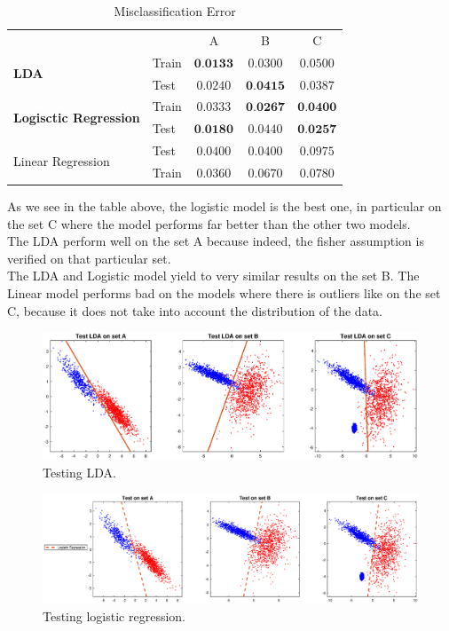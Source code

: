 \documentclass[a4paper,10pt]{article}
\theoremstyle{exostyle}
\begin{document}
\begin{table}[!h]
\centering
\caption{Misclassification Error}
\begin{tabular}{llccc}
\multicolumn{2}{l}{}   & A & B & C \\
\multirow{2}{*}{\textbf{LDA}}                 & Train & $\textbf{0.0133}$   & $0.0300 $  &  $0.0500$ \\
                                      			& Test  & $0.0240$  & $\textbf{0.0415}$  & $0.0387$   \\
\multirow{2}{*}{\textbf{Logisctic Regression}} & Train & $0.0333$   &  $\textbf{0.0267}$ &  $\textbf{0.0400}$ \\
                                      & Test  & $\textbf{0.0180}$  &  $0.0440$ & $\textbf{0.0257}$  \\
\multirow{2}{*}{Linear Regression}    & Test  &  $0.0400$ & $0.0400$  & $0.0975$   \\
                                      & Train &  $0.0360$ & $0.0670$  &  $0.0780$
\end{tabular}
\end{table}
As we see in the table above, the logistic model is the best one, in particular on the set C where the model performs far better than the other two models. \\
The LDA perform well on the set A because indeed, the fisher assumption is verified on that particular set. \\ 
The LDA and Logistic model yield to very similar results on the set B. The Linear model performs bad on the models where there is outliers like on the set C, because it does not take into account the distribution of the data. \\

\begin{figure}[!h]
\includegraphics[width=\textwidth]{classification_data_HWK1/classification_data_HWK1/ldaTest.eps} 
\caption{Testing LDA.}
\end{figure}

\begin{figure}[!h]
\includegraphics[width=\textwidth]{classification_data_HWK1/classification_data_HWK1/logTest.eps} 
\caption{Testing logistic regression.}
\end{figure}
\end{document}
